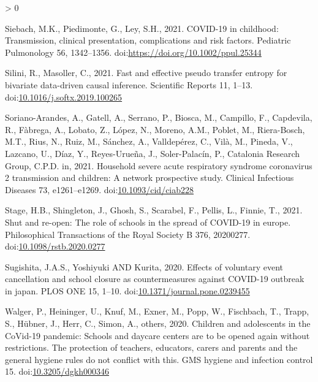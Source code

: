 \documentclass[]{elsarticle} %
\newlength{\cslhangindent}
\newenvironment{CSLReferences}[2] %
 {%
  \setlength{\parindent}{0pt}
  \ifodd #1 \everypar{\setlength{\hangindent}{\cslhangindent}}\ignorespaces\fi
  \ifnum #2 > 0
  \setlength{\parskip}{#2\baselineskip}
  \fi
 }%
 {}
\begin{document}
\begin{CSLReferences}{1}{0}
\leavevmode\hypertarget{ref-siebach2021childhood}{}%
Siebach, M.K., Piedimonte, G., Ley, S.H., 2021. COVID-19 in childhood:
Transmission, clinical presentation, complications and risk factors.
Pediatric Pulmonology 56, 1342--1356.
doi:\url{https://doi.org/10.1002/ppul.25344}

\leavevmode\hypertarget{ref-silini2021fast}{}%
Silini, R., Masoller, C., 2021. Fast and effective pseudo transfer
entropy for bivariate data-driven causal inference. Scientific Reports
11, 1--13.
doi:\href{https://doi.org/10.1016/j.softx.2019.100265}{10.1016/j.softx.2019.100265}

\leavevmode\hypertarget{ref-sorianoarandes2021household}{}%
Soriano-Arandes, A., Gatell, A., Serrano, P., Biosca, M., Campillo, F.,
Capdevila, R., Fàbrega, A., Lobato, Z., López, N., Moreno, A.M., Poblet,
M., Riera-Bosch, M.T., Rius, N., Ruiz, M., Sánchez, A., Valldepérez, C.,
Vilà, M., Pineda, V., Lazcano, U., Díaz, Y., Reyes-Urueña, J.,
Soler-Palacín, P., Catalonia Research Group, C.P.D. in, 2021. Household
severe acute respiratory syndrome coronavirus 2 transmission and
children: A network prospective study. Clinical Infectious Diseases 73,
e1261--e1269.
doi:\href{https://doi.org/10.1093/cid/ciab228}{10.1093/cid/ciab228}

\leavevmode\hypertarget{ref-stage2021shut}{}%
Stage, H.B., Shingleton, J., Ghosh, S., Scarabel, F., Pellis, L.,
Finnie, T., 2021. Shut and re-open: The role of schools in the spread of
COVID-19 in europe. Philosophical Transactions of the Royal Society B
376, 20200277.
doi:\href{https://doi.org/10.1098/rstb.2020.0277}{10.1098/rstb.2020.0277}

\leavevmode\hypertarget{ref-yoshiyuki2020effects}{}%
Sugishita, J.A.S., Yoshiyuki AND Kurita, 2020. Effects of voluntary
event cancellation and school closure as countermeasures against
COVID-19 outbreak in japan. PLOS ONE 15, 1--10.
doi:\href{https://doi.org/10.1371/journal.pone.0239455}{10.1371/journal.pone.0239455}

\leavevmode\hypertarget{ref-walger2020children}{}%
Walger, P., Heininger, U., Knuf, M., Exner, M., Popp, W., Fischbach, T.,
Trapp, S., Hübner, J., Herr, C., Simon, A., others, 2020. Children and
adolescents in the CoVid-19 pandemic: Schools and daycare centers are to
be opened again without restrictions. The protection of teachers,
educators, carers and parents and the general hygiene rules do not
conflict with this. GMS hygiene and infection control 15.
doi:\href{https://doi.org/10.3205/dgkh000346}{10.3205/dgkh000346}


\end{CSLReferences}
\end{document}
